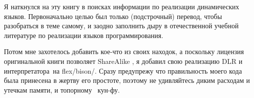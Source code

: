 \secdown{}

Я наткнулся на эту книгу в поисках информации по реализации динамических языков.
Первоначально целью был только (подстрочный) перевод, чтобы разобраться в теме
самому, и заодно заполнить дыру в отечественной учебной литературе по реализации
языков программирования.

Потом мне захотелось добавить кое-что из своих находок, а поскольку лицензия
оригинальной книги
позволяет ShareAlike , я добавил свою реализацию
DLR и интерпретатора\ на flex/bison/\cpp. Сразу предупрежу что
правильность моего кода была принесена в жертву его простоте, поэтому не
удивляйтесь диким расходам и утечкам памяти, и топорному \cpp\ кун-фу.

\secup